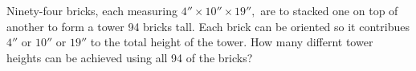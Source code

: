 Ninety-four bricks, each measuring $4''\times10''\times19'',$ are to stacked one on top of another to form a tower 94 bricks tall.  Each brick can be oriented so it contribues $4''$ or $10''$ or $19''$ to the total height of the tower.  How many differnt tower heights can be achieved using all 94 of the bricks?